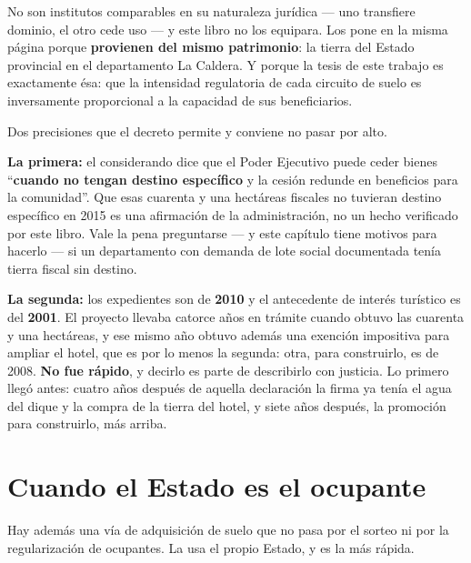 \begin{cautela}
No son institutos comparables en su naturaleza jurídica --- uno transfiere dominio, el otro cede uso --- y este libro no los equipara. Los pone en la misma página porque \textbf{provienen del mismo patrimonio}: la tierra del Estado provincial en el departamento La Caldera. Y porque la tesis de este trabajo es exactamente ésa: que la intensidad regulatoria de cada circuito de suelo es inversamente proporcional a la capacidad de sus beneficiarios.
\end{cautela}

\begin{cautela}
Dos precisiones que el decreto permite y conviene no pasar por alto.

\textbf{La primera:} el considerando dice que el Poder Ejecutivo puede ceder bienes ``\textbf{cuando no tengan destino específico} y la cesión redunde en beneficios para la comunidad''. Que esas cuarenta y una hectáreas fiscales no tuvieran destino específico en 2015 es una afirmación de la administración, no un hecho verificado por este libro. Vale la pena preguntarse --- y este capítulo tiene motivos para hacerlo --- si un departamento con demanda de lote social documentada tenía tierra fiscal sin destino.

\textbf{La segunda:} los expedientes son de \textbf{2010} y el antecedente de interés turístico es del \textbf{2001}. El proyecto llevaba catorce años en trámite cuando obtuvo las cuarenta y una hectáreas, y ese mismo año obtuvo además una exención impositiva para ampliar el hotel, que es por lo menos la segunda: otra, para construirlo, es de 2008. \textbf{No fue rápido}, y decirlo es parte de describirlo con justicia. Lo primero llegó antes: cuatro años después de aquella declaración la firma ya tenía el agua del dique y la compra de la tierra del hotel, y siete años después, la promoción para construirlo, más arriba.
\end{cautela}


\section{Cuando el Estado es el ocupante}

Hay además una vía de adquisición de suelo que no pasa por el sorteo ni por la regularización de ocupantes. La usa el propio Estado, y es la más rápida.

